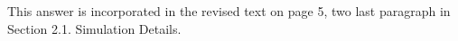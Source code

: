 \documentclass[a4paper,fleqn]{cas-sc}
\begin{document}
This answer is incorporated in the revised text on page 5, two last paragraph in Section 2.1. Simulation Details.




%



\end{document}
